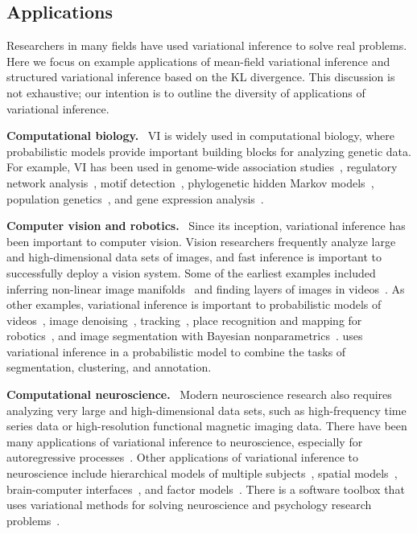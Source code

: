 \documentclass{article}
\DeclareRobustCommand{\parhead}[1]{\textbf{#1}~}
\begin{document}
\subsection{Applications}

Researchers in many fields have used variational inference to solve
real problems. Here we focus on example applications of mean-field
variational inference and structured variational inference based on
the \gls{KL} divergence.  This discussion is not exhaustive; our intention
is to outline the diversity of applications of variational inference.

\parhead{Computational biology.} \gls{VI} is widely used in
computational biology, where probabilistic models provide important
building blocks for analyzing genetic data.  For example, \gls{VI} has
been used in genome-wide association
studies~\citep{Carbonetto:2012,Logsdon:2010}, regulatory network
analysis~\citep{Sanguinetti:2006}, motif detection~\citep{Xing:2004},
phylogenetic hidden Markov models~\citep{Jojic:2004a}, population
genetics~\citep{Raj:2014}, and gene expression
analysis~\citep{Stegle:2010}.

\parhead{Computer vision and robotics.}  Since its inception,
variational inference has been important to computer vision.  Vision
researchers frequently analyze large and high-dimensional data sets of
images, and fast inference is important to successfully deploy a
vision system.  Some of the earliest examples included inferring
non-linear image manifolds~\citep{Bishop:2000} and finding layers of
images in videos~\citep{Jojic:2001}.  As other examples, variational
inference is important to probabilistic models of
videos~\citep{Chan:2009,Wang:2009c}, image
denoising~\citep{Likas:2004}, tracking~\citep{Vermaak:2003,Yu:2005},
place recognition and mapping for
robotics~\citep{Cummins:2008,Ramos:2012}, and image segmentation with
Bayesian nonparametrics~\citep{Sudderth:2008}.  \citet{Du:2009a} uses
variational inference in a probabilistic model to combine the tasks of
segmentation, clustering, and annotation.

\parhead{Computational neuroscience.} Modern neuroscience research
also requires analyzing very large and high-dimensional data sets,
such as high-frequency time series data or high-resolution functional
magnetic imaging data.  There have been many applications of
variational inference to neuroscience, especially for autoregressive
processes~\citep{Roberts:2002,Penny:2003,Penny:2005,Flandin:2007,Harrison:2010}.
Other applications of variational inference to neuroscience include
hierarchical models of multiple subjects~\citep{Woolrich:2004},
spatial
models~\citep{Sato:2004,Zumer:2007,Kiebel:2008,Wipf:2009a,Lashkari:2012},
brain-computer interfaces~\citep{Sykacek:2004}, and factor
models~\citep{Manning:2014,Gershman:2014}.  There is a software
toolbox that uses variational methods for solving neuroscience and
psychology research problems~\citep{Daunizeau:2014}.
\end{document}
